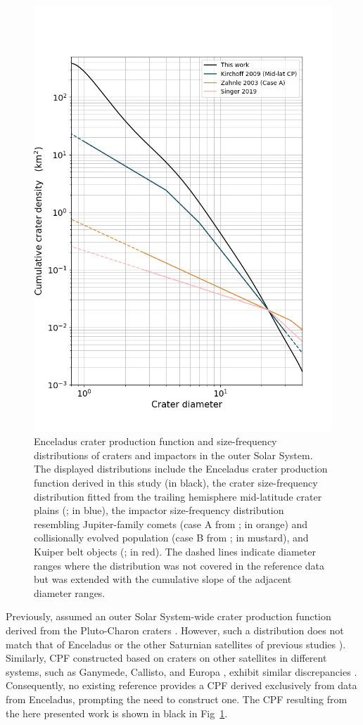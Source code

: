 \documentclass[preprint,11pt,3p,times,authoryear]{elsarticle}
\begin{document}
\begin{figure}[H]
    \centering
    \includegraphics[width=0.6\linewidth]{fig/compare_enc_terrains_degpoly_FigS3.png}
    \caption{Enceladus crater production function and size-frequency distributions of craters and impactors in the outer Solar System. The displayed distributions include the Enceladus crater production function derived in this study (in black), the crater size-frequency distribution fitted from the trailing hemisphere mid-latitude crater plains (\citet{Kirchoff2009}; in blue), the impactor size-frequency distribution resembling Jupiter-family comets (case A from \citet{Zahnle2003}; in orange) and collisionally evolved population (case B from \citet{Zahnle2003}; in mustard), and Kuiper belt objects (\citet{Singer2019}; in red). The dashed lines indicate diameter ranges where the distribution was not covered in the reference data but was extended with the cumulative slope of the adjacent diameter ranges.}
    \label{fig:cpf_compare}
\end{figure}

Previously, \citet{Wong2023} assumed an outer Solar System-wide crater production function derived from the Pluto-Charon craters \citep[red line in Fig~\ref{fig:cpf_compare}]{Singer2019}.
However, such a distribution does not match that of Enceladus or the other Saturnian satellites of previous studies \citep[blue line]{Kirchoff2022}). 
Similarly, CPF constructed based on craters on other satellites in different systems, such as Ganymede, Callisto, and Europa \citep[orange line]{Zahnle2003}, exhibit similar discrepancies \citep{Wong2023}. Consequently, no existing reference provides a CPF derived exclusively from data from Enceladus, prompting the need to construct one. The CPF resulting from the here presented work is shown in black in Fig~\ref{fig:cpf_compare}. \\
\end{document}
